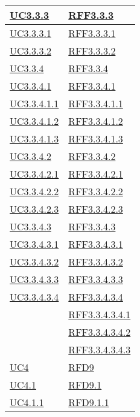\begin{longtable}{|>{\centering}m{5cm}|m{5cm}<{\centering}|}
\hyperref[UC3.3.3]{UC3.3.3} & \hyperlink{RFF3.3.3}{RFF3.3.3}\\ \hline
\hyperref[UC3.3.3.1]{UC3.3.3.1} & \hyperlink{RFF3.3.3.1}{RFF3.3.3.1}\\ \hline
\hyperref[UC3.3.3.2]{UC3.3.3.2} & \hyperlink{RFF3.3.3.2}{RFF3.3.3.2}\\ \hline
\hyperref[UC3.3.4]{UC3.3.4} & \hyperlink{RFF3.3.4}{RFF3.3.4}\\ \hline
\hyperref[UC3.3.4.1]{UC3.3.4.1} & \hyperlink{RFF3.3.4.1}{RFF3.3.4.1}\\ \hline
\hyperref[UC3.3.4.1.1]{UC3.3.4.1.1} & \hyperlink{RFF3.3.4.1.1}{RFF3.3.4.1.1}\\ \hline
\hyperref[UC3.3.4.1.2]{UC3.3.4.1.2} & \hyperlink{RFF3.3.4.1.2}{RFF3.3.4.1.2}\\ \hline
\hyperref[UC3.3.4.1.3]{UC3.3.4.1.3} & \hyperlink{RFF3.3.4.1.3}{RFF3.3.4.1.3}\\ \hline
\hyperref[UC3.3.4.2]{UC3.3.4.2} & \hyperlink{RFF3.3.4.2}{RFF3.3.4.2}\\ \hline
\hyperref[UC3.3.4.2.1]{UC3.3.4.2.1} & \hyperlink{RFF3.3.4.2.1}{RFF3.3.4.2.1}\\ \hline
\hyperref[UC3.3.4.2.2]{UC3.3.4.2.2} & \hyperlink{RFF3.3.4.2.2}{RFF3.3.4.2.2}\\ \hline
\hyperref[UC3.3.4.2.3]{UC3.3.4.2.3} & \hyperlink{RFF3.3.4.2.3}{RFF3.3.4.2.3}\\ \hline
\hyperref[UC3.3.4.3]{UC3.3.4.3} & \hyperlink{RFF3.3.4.3}{RFF3.3.4.3}\\ \hline
\hyperref[UC3.3.4.3.1]{UC3.3.4.3.1} & \hyperlink{RFF3.3.4.3.1}{RFF3.3.4.3.1}\\ \hline
\hyperref[UC3.3.4.3.2]{UC3.3.4.3.2} & \hyperlink{RFF3.3.4.3.2}{RFF3.3.4.3.2}\\ \hline
\hyperref[UC3.3.4.3.3]{UC3.3.4.3.3} & \hyperlink{RFF3.3.4.3.3}{RFF3.3.4.3.3}\\ \hline
\hyperref[UC3.3.4.3.4]{UC3.3.4.3.4} & \hyperlink{RFF3.3.4.3.4}{RFF3.3.4.3.4}\\
& \hyperlink{RFF3.3.4.3.4.1}{RFF3.3.4.3.4.1}\\
& \hyperlink{RFF3.3.4.3.4.2}{RFF3.3.4.3.4.2}\\
& \hyperlink{RFF3.3.4.3.4.3}{RFF3.3.4.3.4.3}\\ \hline
\hyperref[UC4]{UC4} & \hyperlink{RFD9}{RFD9}\\ \hline
\hyperref[UC4.1]{UC4.1} & \hyperlink{RFD9.1}{RFD9.1}\\ \hline
\hyperref[UC4.1.1]{UC4.1.1} & \hyperlink{RFD9.1.1}{RFD9.1.1}\\ \hline

\end{longtable}
